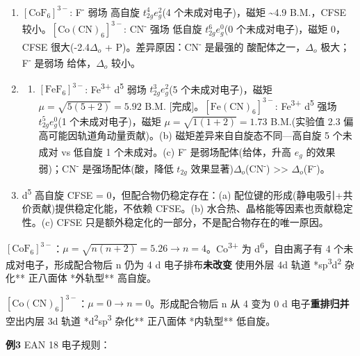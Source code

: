 \begin{enumerate}
\begin{enumerate}
  \end{enumerate}
\item
  \([\mathrm{CoF_6}]^{3-}\): F\textsuperscript{-} 弱场 \箭 高自旋 \(t_{2g}^4 e_g^2\)(4 个未成对电子)，磁矩 \textasciitilde4.9 B.M.，CFSE 较小。\([\mathrm{Co(CN)_6}]^{3-}\): CN\textsuperscript{-} 强场 \箭 低自旋 \(t_{2g}^6 e_g^0\)(0 个未成对电子)，磁矩 0，CFSE 很大(-2.4\(\Delta_o\) + P)。差异原因：CN\textsuperscript{-} 是最强的 \派 酸配体之一，\(\Delta_o\) 极大；F\textsuperscript{-} 是弱场 \派 给体，\(\Delta_o\) 较小。
\item
  \begin{enumerate}
  \def\labelenumii{(\alph{enumii})}
  \tightlist
  \item
    \([\mathrm{FeF_6}]^{3-}\): Fe\textsuperscript{3+} d\textsuperscript{5} 弱场 \箭 \(t_{2g}^3 e_g^2\)(5 个未成对电子)，磁矩 \(\mu = \sqrt{5(5+2)} = 5.92\) B.M. {[}完成{]}。\([\mathrm{Fe(CN)_6}]^{3-}\): Fe\textsuperscript{3+} d\textsuperscript{5} 强场 \箭 \(t_{2g}^5 e_g^0\)(1 个未成对电子)，磁矩 \(\mu = \sqrt{1(1+2)} = 1.73\) B.M.(实验值 2.3 偏高可能因轨道角动量贡献)。(b) 磁矩差异来自自旋态不同---高自旋 5 个未成对 vs 低自旋 1 个未成对。(c) F\textsuperscript{-} 是弱场配体(\派 给体，升高 \(e_g\) 的效果弱)；CN\textsuperscript{-} 是强场配体(\派 酸，降低 \(t_{2g}\) 效果显著)\箭 \(\Delta_o\)(CN\textsuperscript{-}) \textgreater\textgreater{} \(\Delta_o\)(F\textsuperscript{-})。
  \end{enumerate}
\item
  d\textsuperscript{5} 高自旋 CFSE = 0，但配合物仍稳定存在：(a) 配位键的形成(静电吸引+共价贡献)提供稳定化能，不依赖 CFSE。(b) 水合热、晶格能等因素也贡献稳定性。(c) CFSE 只是额外稳定化的一部分，不是配合物存在的唯一原因。
\end{enumerate}

\textbf{\([\mathrm{CoF_6}]^{3-}\)}：\(\mu = \sqrt{n(n+2)} = 5.26 \rightarrow n = 4\)。Co\textsuperscript{3+} 为 d\textsuperscript{6}，自由离子有 4 个未成对电子，形成配合物后 n 仍为 4 \箭 d 电子排布\textbf{未改变} \箭 使用外层 4d 轨道 \箭 **sp\textsuperscript{3}d\textsuperscript{2} 杂化** \箭 正八面体 \箭 **外轨型** \箭 高自旋。

\textbf{\([\mathrm{Co(CN)_6}]^{3-}\)}：\(\mu = 0 \rightarrow n = 0\)。形成配合物后 n 从 4 变为 0 \箭 d 电子\textbf{重排归并} \箭 空出内层 3d 轨道 \箭 **d\textsuperscript{2}sp\textsuperscript{3} 杂化** \箭 正八面体 \箭 **内轨型** \箭 低自旋。

\textbf{例3} EAN 18 电子规则：

